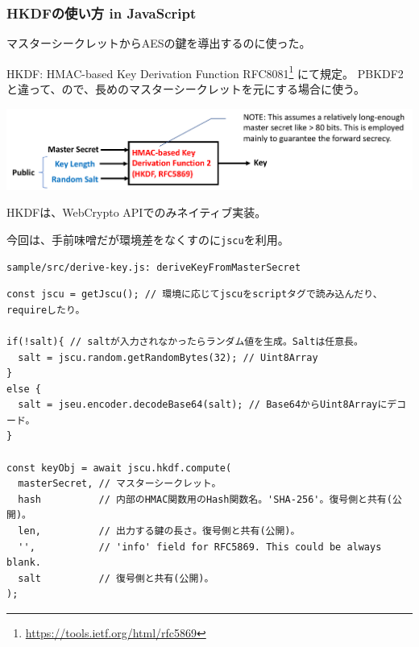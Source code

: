 \documentclass[12pt,dvipdfmx]{beamer}
\begin{document}
\begin{frame}
\frametitle{HKDFの使い方 in JavaScript}
マスターシークレットからAESの鍵を導出するのに使った。
\begin{block}{\small HKDF: HMAC-based Key Derivation Function}
RFC8081\footnote[frame]{\scriptsize \url{https://tools.ietf.org/html/rfc5869}} にて規定。
PBKDF2と違って、ので、長めのマスターシークレットを元にする場合に使う。
\end{block}

\begin{center}
\includegraphics[width=\linewidth]{Figs/kdf_hkdf_flow.pdf}
\end{center}
\end{frame}

\begin{frame}[fragile]
HKDFは、WebCrypto APIでのみネイティブ実装。

今回は、手前味噌だが環境差をなくすのに\texttt{jscu}を利用。

\begin{exampleblock}{\small \texttt{sample/src/derive-key.js: deriveKeyFromMasterSecret}}
\scriptsize
\begin{verbatim}
const jscu = getJscu(); // 環境に応じてjscuをscriptタグで読み込んだり、requireしたり。

if(!salt){ // saltが入力されなかったらランダム値を生成。Saltは任意長。
  salt = jscu.random.getRandomBytes(32); // Uint8Array
}
else {
  salt = jseu.encoder.decodeBase64(salt); // Base64からUint8Arrayにデコード。
}

const keyObj = await jscu.hkdf.compute(
  masterSecret, // マスターシークレット。
  hash          // 内部のHMAC関数用のHash関数名。'SHA-256'。復号側と共有(公開)。
  len,          // 出力する鍵の長さ。復号側と共有(公開)。
  '',           // 'info' field for RFC5869. This could be always blank.
  salt          // 復号側と共有(公開)。
);
\end{verbatim}

\end{exampleblock}
\end{frame}
\end{document}
